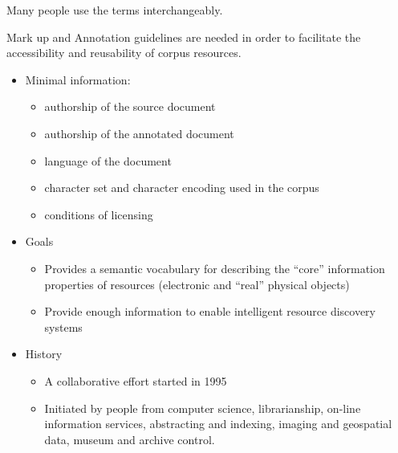 \documentclass[a4paper,landscape,headrule,footrule,xetex]{foils}
\begin{document}
Many people use the terms interchangeably.



Mark up and Annotation guidelines are needed in order to
facilitate the accessibility and reusability of corpus
resources.
\begin{itemize}
\item Minimal information:
  \begin{itemize}
  \item authorship of the source document
  \item authorship of the annotated document
  \item language of the document
  \item character set and character encoding used in the corpus
  \item conditions of licensing
  \end{itemize}
\end{itemize}

\begin{itemize}
\item Goals
\begin{itemize}
\item Provides a semantic vocabulary for describing the
``core'' information properties of resources (electronic
and ``real'' physical objects)
\item Provide enough information to enable intelligent
resource discovery systems

\end{itemize}

\item History
\begin{itemize}
\item A collaborative effort started in 1995
\item Initiated by people from computer science,
librarianship, on-line information services, abstracting
and indexing, imaging and geospatial data, museum
and archive control.
\end{itemize}
\end{itemize}
\end{document}
